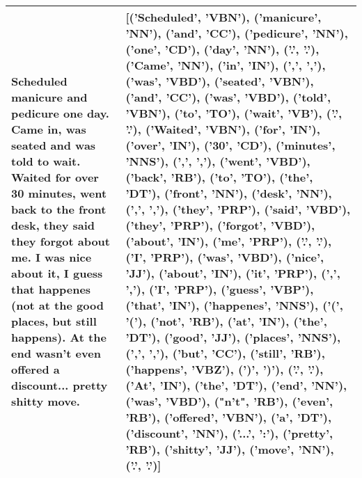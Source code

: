 \begin{longtable}{| p{3cm} | p{3cm} |}
         Scheduled manicure and pedicure one day. Came in, was seated and was told to wait. Waited for over 30 minutes, went back to the front desk, they said they forgot about me. I was nice about it, I guess that happenes (not at the good places, but still happens). At the end wasn't even offered a discount... pretty shitty move. & [('Scheduled', 'VBN'), ('manicure', 'NN'), ('and', 'CC'), ('pedicure', 'NN'), ('one', 'CD'), ('day', 'NN'), ('.', '.'), ('Came', 'NN'), ('in', 'IN'), (',', ','), ('was', 'VBD'), ('seated', 'VBN'), ('and', 'CC'), ('was', 'VBD'), ('told', 'VBN'), ('to', 'TO'), ('wait', 'VB'), ('.', '.'), ('Waited', 'VBN'), ('for', 'IN'), ('over', 'IN'), ('30', 'CD'), ('minutes', 'NNS'), (',', ','), ('went', 'VBD'), ('back', 'RB'), ('to', 'TO'), ('the', 'DT'), ('front', 'NN'), ('desk', 'NN'), (',', ','), ('they', 'PRP'), ('said', 'VBD'), ('they', 'PRP'), ('forgot', 'VBD'), ('about', 'IN'), ('me', 'PRP'), ('.', '.'), ('I', 'PRP'), ('was', 'VBD'), ('nice', 'JJ'), ('about', 'IN'), ('it', 'PRP'), (',', ','), ('I', 'PRP'), ('guess', 'VBP'), ('that', 'IN'), ('happenes', 'NNS'), ('(', '('), ('not', 'RB'), ('at', 'IN'), ('the', 'DT'), ('good', 'JJ'), ('places', 'NNS'), (',', ','), ('but', 'CC'), ('still', 'RB'), ('happens', 'VBZ'), (')', ')'), ('.', '.'), ('At', 'IN'), ('the', 'DT'), ('end', 'NN'), ('was', 'VBD'), ("n't", 'RB'), ('even', 'RB'), ('offered', 'VBN'), ('a', 'DT'), ('discount', 'NN'), ('...', ':'), ('pretty', 'RB'), ('shitty', 'JJ'), ('move', 'NN'), ('.', '.')] \\  
         \hline
    \end{longtable}

    

